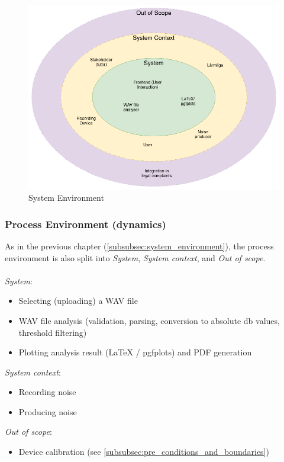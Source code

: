 \begin{figure}[H]
    \centering
    \includegraphics[width=\textwidth]{../assets/system_environment.png}
    \caption{System Environment}
\end{figure}

\subsubsection{Process Environment (dynamics)}
\label{subsubsec:process_environment}
As in the previous chapter (\ref{subsubsec:system_environment}), the process environment is also split into \textit{System}, \textit{System context}, and \textit{Out of scope}. \\ \\
\textit{System}:
\begin{itemize}
    \item Selecting (uploading) a WAV file
    \item WAV file analysis (validation, parsing, conversion to absolute db values, threshold filtering)
    \item Plotting analysis result (LaTeX / pgfplots) and PDF generation
\end{itemize}
\textit{System context}:
\begin{itemize}
    \item Recording noise
    \item Producing noise
\end{itemize}
\textit{Out of scope}:
\begin{itemize}
    \item Device calibration (see \ref{subsubsec:pre_conditions_and_boundaries})
\end{itemize}

